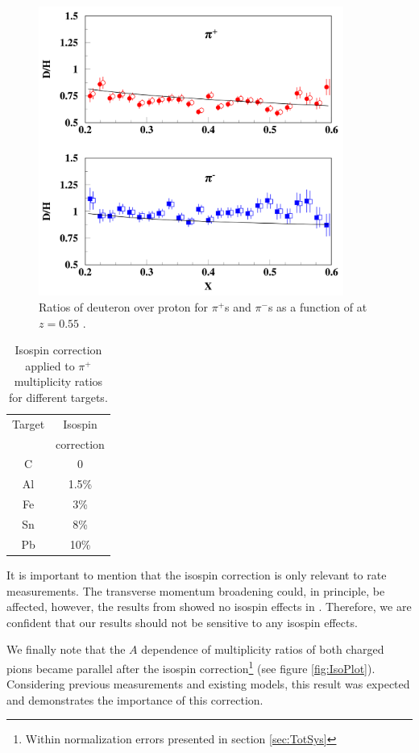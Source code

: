 \begin{figure}[tbp]
\centering
\includegraphics[width=10cm] {chap5-fig/HallC-Isospin.png}
\caption {Ratios of deuteron over proton for $\pi^+$s and $\pi^-$s 
as a function of \xb at $z=0.55$ \cite{Asaturyan:2011mq}.}
\label{fig:RCexample}
\end{figure}

\begin{table}[htbp]
  \centering
  \begin{tabular}{@{} cc @{}}
    \hline
    Target & Isospin  \\ 
           & correction \\ 
    \hline
    C & 0 \\
    Al & 1.5\%\\
    Fe &  3\% \\
    Sn &  8\%\\
    Pb &  10\% \\
    \hline
  \end{tabular}
  \caption{Isospin correction applied to $\pi^+$ multiplicity ratios for different targets.}
  \label{tab:isospin}
\end{table}

It is important to mention that the isospin correction is only relevant to 
rate measurements. The transverse momentum broadening could, in principle, 
be affected, however, the results from \cite{Asaturyan:2011mq} showed no 
isospin effects in \ptp. Therefore, we are confident that our \dpt results 
should not be sensitive to any isospin effects.

We finally note that the $A$ dependence of multiplicity ratios of both 
charged pions became parallel after the isospin correction\footnote{Within 
normalization errors presented in section \ref{sec:TotSys}} (see figure 
\ref{fig:IsoPlot}). Considering previous measurements and existing models, 
this result was expected and demonstrates the importance of this correction.

